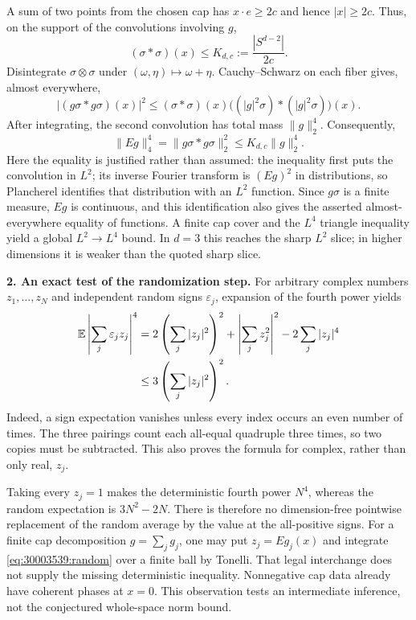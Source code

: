 \documentclass[11pt,a4paper]{article}
\numberwithin{equation}{section}
\begin{document}
A sum of two points from the chosen cap has $x\cdot e\ge2c$ and hence
$|x|\ge2c$. Thus, on the support of the convolutions involving $g$,
\[
 (\sigma*\sigma)(x)\le K_{d,c}:=\frac{|S^{d-2}|}{2c}.
\]
Disintegrate $\sigma\otimes\sigma$ under $(\omega,\eta)\mapsto\omega+\eta$.
Cauchy--Schwarz on each fiber gives, almost everywhere,
\[
 |(g\sigma*g\sigma)(x)|^2
 \le (\sigma*\sigma)(x)
       \bigl((|g|^2\sigma)*(|g|^2\sigma)\bigr)(x).
\]
After integrating, the second convolution has total mass $\|g\|_2^4$.
Consequently,
\begin{equation}\label{eq:30003539:cap-four}
 \|Eg\|_4^4=\|g\sigma*g\sigma\|_2^2
       \le K_{d,c}\|g\|_2^4.
\end{equation}
Here the equality is justified rather than assumed: the inequality first
puts the convolution in $L^2$; its inverse Fourier transform is $(Eg)^2$
in distributions, so Plancherel identifies that distribution with an $L^2$
function. Since $g\sigma$ is a finite measure, $Eg$ is continuous, and this
identification also gives the asserted almost-everywhere equality of
functions. A finite cap cover and the $L^4$ triangle inequality yield a
global $L^2\to L^4$ bound. In $d=3$ this reaches the sharp $L^2$ slice;
in higher dimensions it is weaker than the quoted sharp slice.

\textbf{2. An exact test of the randomization step.}
For arbitrary complex numbers $z_1,\ldots,z_N$ and independent random signs
$\varepsilon_j$, expansion of the fourth power yields
\begin{align}
 \mathbb E\left|\sum_j\varepsilon_jz_j\right|^4
 &=2\left(\sum_j|z_j|^2\right)^2+
       \left|\sum_jz_j^2\right|^2-2\sum_j|z_j|^4\notag\\
 &\le3\left(\sum_j|z_j|^2\right)^2.
 \label{eq:30003539:random}
\end{align}
Indeed, a sign expectation vanishes unless every index occurs an even
number of times. The three pairings count each all-equal quadruple three
times, so two copies must be subtracted. This also proves the formula for
complex, rather than only real, $z_j$.

Taking every $z_j=1$ makes the deterministic fourth power $N^4$, whereas
the random expectation is $3N^2-2N$. There is therefore no dimension-free
pointwise replacement of the random average by the value at the all-positive
signs. For a finite cap decomposition $g=\sum_jg_j$, one may put
$z_j=Eg_j(x)$ and integrate \eqref{eq:30003539:random} over a finite ball by
Tonelli. That legal interchange does not supply the missing deterministic
inequality. Nonnegative cap data already have coherent phases at $x=0$.
This observation tests an intermediate inference, not the conjectured
whole-space norm bound.
\end{document}
